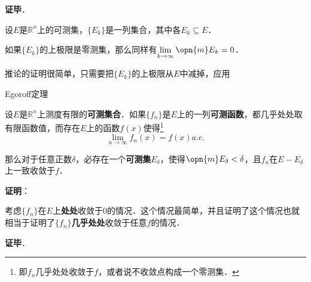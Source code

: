 \textbf{证毕}．

\begin{corollary}{}
设$E$是$\mathbb{R}^n$上的可测集，$\{E_k\}$是一列集合，其中各$E_k\subseteq E$．

如果$\{E_k\}$的上极限是零测集，那么同样有$\lim\limits_{k\to\infty}\opn{m}E_k=0$．
\end{corollary}

推论的证明很简单，只需要把$\{E_k\}$的上极限从$E$中减掉，应用




\begin{theorem}{Egoroff定理}

设$E$是$\mathbb{R}^n$上测度有限的\textbf{可测集合}．如果$\{f_n\}$是$E$上的一列\textbf{可测函数}，都几乎处处取有限函数值，而存在$E$上的函数$f(x)$使得\footnote{即$f_n$几乎处处收敛于$f$，或者说不收敛点构成一个零测集．}\begin{equation}
\lim\limits_{n\to\infty}f_n(x)=f(x)a. e. 
\end{equation}

那么对于任意正数$\delta$，必存在一个\textbf{可测集}$E_\delta$，使得$\opn{m}E_\delta<\delta$，且$f_n$在$E-E_\delta$上一致收敛于$f$．

\end{theorem}

\textbf{证明}：

考虑$\{f_n\}$在$E$上\textbf{处处}收敛于$0$的情况．这个情况最简单，并且证明了这个情况也就相当于证明了$\{f_n\}$\textbf{几乎处处}收敛于任意$f$的情况．

\textbf{证毕}．










